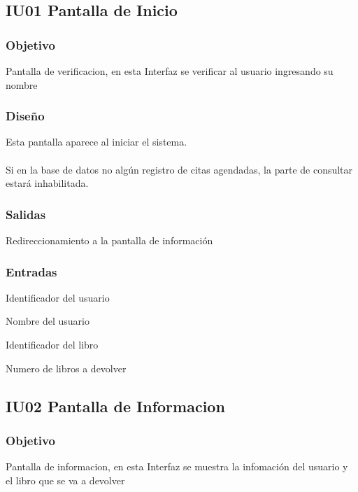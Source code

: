 \newpage
\subsection{IU01 Pantalla de Inicio}

\subsubsection{Objetivo}
	Pantalla de verificacion, en esta Interfaz se verificar al usuario ingresando su nombre  

\subsubsection{Diseño}
	Esta pantalla aparece al iniciar el sistema.  \\\\
	Si en la base de datos no algún registro de citas agendadas, la parte de consultar estará inhabilitada. 


\subsubsection{Salidas}
	\begin{Citemize}
		\item Redireccionamiento a la pantalla de información  
	\end{Citemize}
	
\subsubsection{Entradas}
	\begin{Citemize}
	\item Identificador del usuario
		\item Nombre del usuario 
		\item Identificador del libro
		\item Numero de libros a devolver
	\end{Citemize}

\subsection{IU02 Pantalla de Informacion}

\subsubsection{Objetivo}
	Pantalla de informacion, en esta Interfaz se muestra la infomación del usuario y el libro que se va a devolver  


